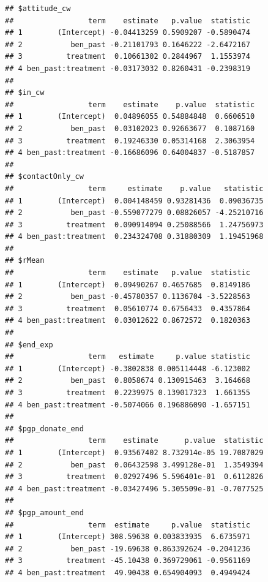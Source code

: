\documentclass[
]{article}
\begin{document}
\begin{verbatim}
## $attitude_cw
##                 term    estimate   p.value  statistic
## 1        (Intercept) -0.04413259 0.5909207 -0.5890474
## 2           ben_past -0.21101793 0.1646222 -2.6472167
## 3          treatment  0.10661302 0.2844967  1.1553974
## 4 ben_past:treatment -0.03173032 0.8260431 -0.2398319
## 
## $in_cw
##                 term    estimate    p.value  statistic
## 1        (Intercept)  0.04896055 0.54884848  0.6606510
## 2           ben_past  0.03102023 0.92663677  0.1087160
## 3          treatment  0.19246330 0.05314168  2.3063954
## 4 ben_past:treatment -0.16686096 0.64004837 -0.5187857
## 
## $contactOnly_cw
##                 term     estimate    p.value   statistic
## 1        (Intercept)  0.004148459 0.93281436  0.09036735
## 2           ben_past -0.559077279 0.08826057 -4.25210716
## 3          treatment  0.090914094 0.25088566  1.24756973
## 4 ben_past:treatment  0.234324708 0.31880309  1.19451968
## 
## $rMean
##                 term    estimate   p.value  statistic
## 1        (Intercept)  0.09490267 0.4657685  0.8149186
## 2           ben_past -0.45780357 0.1136704 -3.5228563
## 3          treatment  0.05610774 0.6756433  0.4357864
## 4 ben_past:treatment  0.03012622 0.8672572  0.1820363
## 
## $end_exp
##                 term   estimate     p.value statistic
## 1        (Intercept) -0.3802838 0.005114448 -6.123002
## 2           ben_past  0.8058674 0.130915463  3.164668
## 3          treatment  0.2239975 0.139017323  1.661355
## 4 ben_past:treatment -0.5074066 0.196886090 -1.657151
## 
## $pgp_donate_end
##                 term    estimate      p.value  statistic
## 1        (Intercept)  0.93567402 8.732914e-05 19.7087029
## 2           ben_past  0.06432598 3.499128e-01  1.3549394
## 3          treatment  0.02927496 5.596401e-01  0.6112826
## 4 ben_past:treatment -0.03427496 5.305509e-01 -0.7077525
## 
## $pgp_amount_end
##                 term  estimate     p.value  statistic
## 1        (Intercept) 308.59638 0.003833935  6.6735971
## 2           ben_past -19.69638 0.863392624 -0.2041236
## 3          treatment -45.10438 0.369729061 -0.9561169
## 4 ben_past:treatment  49.90438 0.654904093  0.4949424
\end{verbatim}
\end{document}
